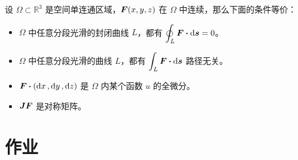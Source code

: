 \begin{theorem}
	设 $\Omega \subset \mathbb{R}^3$ 是空间单连通区域，$\boldsymbol{F}(x, y, z)$ 在 $\Omega$ 中连续，那么下面的条件等价：
	\begin{itemize}
		\item $\Omega$ 中任意分段光滑的封闭曲线 $L$，都有 $\displaystyle \oint_L \vect{F} \vdot \dd{\vect{s}} = 0$。
		\item $\Omega$ 中任意分段光滑的曲线 $L$，都有 $\displaystyle \int_L \vect{F} \vdot \dd{\vect{s}}$ 路径无关。
		\item $\vect{F} \vdot (\dd{x}, \dd{y}, \dd{z})$ 是 $\Omega$ 内某个函数 $u$ 的全微分。
		\item $\boldsymbol{J} \boldsymbol{F}$ 是对称矩阵。
	\end{itemize}
\end{theorem}

\section{作业}


